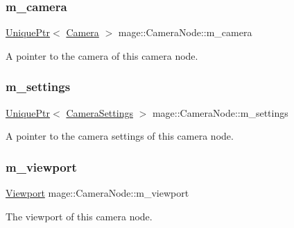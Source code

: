 \subsubsection{\texorpdfstring{m\+\_\+camera}{m\_camera}}
{\footnotesize\ttfamily \hyperlink{namespacemage_a3316d7143a973e37adf1110f2e80ca31}{Unique\+Ptr}$<$ \hyperlink{classmage_1_1_camera}{Camera} $>$ mage\+::\+Camera\+Node\+::m\+\_\+camera\hspace{0.3cm}{\ttfamily [private]}}

A pointer to the camera of this camera node. \hypertarget{classmage_1_1_camera_node_aa8b1f1204534b3ee271e62b7cfe0f833}{}\label{classmage_1_1_camera_node_aa8b1f1204534b3ee271e62b7cfe0f833} 
\subsubsection{\texorpdfstring{m\+\_\+settings}{m\_settings}}
{\footnotesize\ttfamily \hyperlink{namespacemage_a3316d7143a973e37adf1110f2e80ca31}{Unique\+Ptr}$<$ \hyperlink{classmage_1_1_camera_settings}{Camera\+Settings} $>$ mage\+::\+Camera\+Node\+::m\+\_\+settings\hspace{0.3cm}{\ttfamily [private]}}

A pointer to the camera settings of this camera node. \hypertarget{classmage_1_1_camera_node_a338e6f3112a167a7f81de59c7e33e87b}{}\label{classmage_1_1_camera_node_a338e6f3112a167a7f81de59c7e33e87b} 
\subsubsection{\texorpdfstring{m\+\_\+viewport}{m\_viewport}}
{\footnotesize\ttfamily \hyperlink{classmage_1_1_viewport}{Viewport} mage\+::\+Camera\+Node\+::m\+\_\+viewport\hspace{0.3cm}{\ttfamily [private]}}

The viewport of this camera node. 